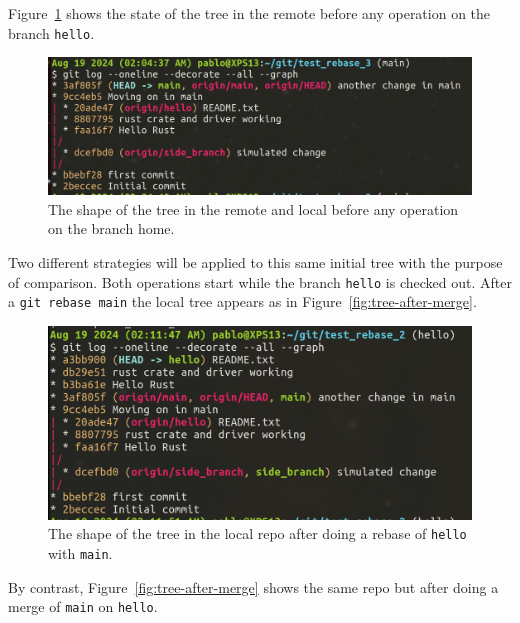 \documentclass[10pt]{article}
\begin{document}
Figure~\ref{fig:initial-tree} shows the state of the tree in the remote before any operation on the branch \texttt{hello}.

\begin{figure}
    \centering
    \includegraphics[width=\textwidth]{images/Tree_before_any_op.png}
    \caption{The shape of the tree in the remote and local before any operation on the branch home.}
    \label{fig:initial-tree}
\end{figure}

Two different strategies will be applied to this same initial tree with the purpose of comparison.
Both operations start while the branch \texttt{hello} is checked out. 
After a \texttt{git rebase main} the local tree appears as in Figure~\ref{fig:tree-after-merge}. 


\begin{figure}
    \centering
    \includegraphics[width=\textwidth]{images/Tree_after_rebase_main_on_hello.png}
    \caption{The shape of the tree in the local repo after doing a rebase of \texttt{hello} with \texttt{main}.}
    \label{fig:tree-after-rebase}
\end{figure}

By contrast, Figure~\ref{fig:tree-after-merge} shows the same repo but after doing a merge of \texttt{main} on \texttt{hello}.
\end{document}
